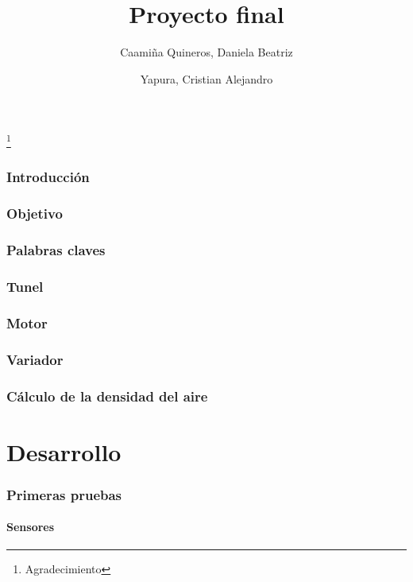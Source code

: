 \documentclass[12pt,a4paper]{article}
\author{Caamiña Quineros, Daniela Beatriz\\ \and Yapura, Cristian Alejandro}
\title{Proyecto final}
\begin{document}
	\maketitle
	\newpage
	\thanks{Agradecimiento}
	\newpage
	\tableofcontents
	\newpage
	\listoffigures
	\newpage

	\section{Introducción}
	

	\section{Objetivo}
	

	\section{Palabras claves}
	

	\section{Tunel}
		

	\section{Motor}
	

	\section{Variador}
	
	


	
	\section{Cálculo de la densidad del aire}
		
	\part{Desarrollo}
	\section{Primeras pruebas}
	\subsection{Sensores}
\end{document}
